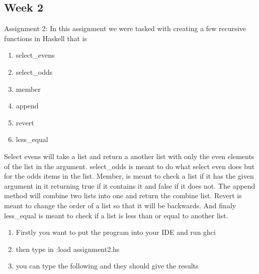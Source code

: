 \documentclass{article}
\theoremstyle{theorem}
\theoremstyle{definition}
\theoremstyle{remark}
\begin{document}
\subsection{Week 2}
 Assignment 2: In this assignment we were tasked with creating a few recursive functions in Haskell that is  
\begin{enumerate}
\item  select\_evens
\item select\_odds
\item member
\item append
\item revert
\item less\_equal
\end{enumerate}
Select evens will take a list and return a another list with only the even elements of the list in the argument. select\_odds is meant to do what select even does but for the odds items in the list. Member, is meant to check a list if it has the given argument in it returning true if it contains it and false if it does not. The append method will combine two lists into one and return the combine list. Revert is meant to change the order of a list so that it will be backwards. And finaly less\_equal is meant to check if a list is less than or equal to another list. 
\begin{enumerate}

\item Firstly you want to put the program into your IDE and run ghci
\item then type in  :load assignment2.hs
\item you can type the following  and they should give the results
\end{enumerate}
\end{document}
